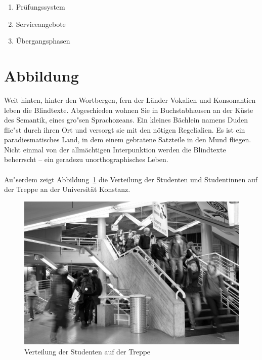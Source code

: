 \begin{enumerate}
\item Prüfungssystem
\item Serviceangebote
\item Übergangsphasen

\end{enumerate}





\section{Abbildung}

Weit hinten, hinter den Wortbergen, fern der Länder Vokalien und Konsonantien leben die Blindtexte. Abgeschieden wohnen Sie in Buchstabhausen an der Küste des Semantik, eines gro"sen Sprachozeans. Ein kleines Bächlein namens Duden flie"st durch ihren Ort und versorgt sie mit den nötigen Regelialien. Es ist ein paradiesmatisches Land, in dem einem gebratene Satzteile in den Mund fliegen. Nicht einmal von der allmächtigen Interpunktion werden die Blindtexte beherrscht – ein geradezu unorthographisches Leben.\\
\\
Au"serdem zeigt Abbildung~\ref{fig:treppe} die Verteilung der Studenten und Studentinnen auf der Treppe an der Universität Konstanz.
\begin{figure}[H]
\includegraphics[width=\textwidth]{graphics/indoor_sw.png}
\caption{Verteilung der Studenten auf der Treppe}
\label{fig:treppe}
\end{figure}

